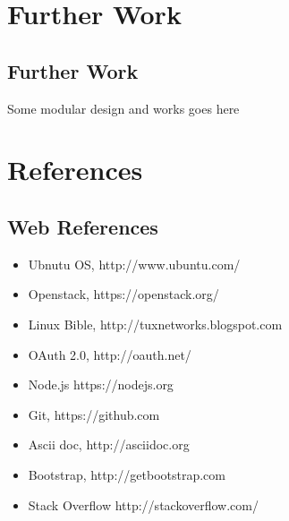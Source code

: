 \documentclass[12pt]{report}
\begin{document}
\chapter{Further Work}

\section{Further Work}

	Some modular design and works goes here	

\chapter{References}

\section{Web References}

\begin{itemize}
\item Ubnutu OS, http://www.ubuntu.com/
\item Openstack, https://openstack.org/
\item Linux Bible, http://tuxnetworks.blogspot.com
\item OAuth 2.0, http://oauth.net/
\item Node.js https://nodejs.org
\item Git, https://github.com
\item Ascii doc, http://asciidoc.org
\item Bootstrap, http://getbootstrap.com 
\item Stack Overflow http://stackoverflow.com/

\end{itemize}
		
\end{document}
